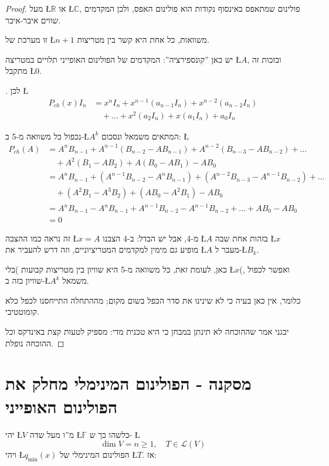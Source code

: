 \documentclass[english,hebrew]{article}
\begin{document}
\begin{proof}
מעל \L{$\mathbb{R}$} או \L{$\mathbb{C}$}, פולינום שמתאפס באינסוף
נקודות הוא פולינום האפס, ולכן המקדמים שווים איבר-איבר.

זו מערכת של \L{$n+1$} משוואות, כל אחת היא קשר בין מטריצות. 

יש כאן \textquotedblright קונספירציה\textquotedblright : המקדמים של
הפולינום האופייני תלויים במטריצה \L{$A$}, ובזכות זה מתקבל \L{$0$}.

{\endL}. לכן \L{%
\begin{align*}
P_{ch}(x)I_{n} & =x^{n}I_{n}+x^{n-1}(a_{n-1}I_{n})+x^{n-2}(a_{n-2}I_{n})\\
 & \quad+\dots+x^{2}(a_{2}I_{n})+x(a_{1}I_{n})+a_{0}I_{n}
\end{align*}
}%

נכפול כל משוואה מ-5 ב-\L{$A^{k}$} המתאים משמאל ונסכום: \L{%
\begin{align*}
P_{ch}(A) & =A^{n}B_{n-1}+A^{n-1}(B_{n-2}-AB_{n-1})+A^{n-2}(B_{n-3}-AB_{n-2})+\dots\\
 & \quad+A^{2}(B_{1}-AB_{2})+A(B_{0}-AB_{1})-AB_{0}\\
 & =A^{n}B_{n-1}+\left(A^{n-1}B_{n-2}-A^{n}B_{n-1}\right)+\left(A^{n-2}B_{n-3}-A^{n-1}B_{n-2}\right)+\dots\\
 & \quad+\left(A^{2}B_{1}-A^{3}B_{2}\right)+\left(AB_{0}-A^{2}B_{1}\right)-AB_{0}\\
 & =A^{n}B_{n-1}-A^{n}B_{n-1}+A^{n-1}B_{n-2}-A^{n-1}B_{n-2}+\dots+AB_{0}-AB_{0}\\
 & =0
\end{align*}
}%

זה נראה כמו ההצבה \L{$x=A$} מ-4, אבל יש הבדל: ב-4 הצבנו \L{$A$}
בזהות אחת שבה \L{$x$} מופיע גם מימין למקדמים המטריציוניים, וזה דרש
להעביר את \L{$A$} מעבר ל-\L{$B_{k}$}. 

כאן, לעומת זאת, כל משוואה מ-5 היא שוויון בין מטריצות קבועות )בלי \L{$x$}(,
ואפשר לכפול שוויון כזה ב-\L{$A^{k}$} משמאל.

כלומר, אין כאן בעיה כי לא שינינו את סדר הכפל בשום מקום; מההתחלה התייחסנו
לכפל כלא קומוטטיבי.

יבגני אמר שההוכחה לא תינתן במבחן כי היא טכנית מדי: מספיק לטעות קצת
באינדקס וכל ההוכחה נופלת.
\end{proof}

\section{מסקנה - הפולינום המינימלי מחלק את הפולינום האופייני}

יהי \L{$V$} מ\textquotedblright ו מעל שדה \L{$\mathbb{F}$} כלשהו
כך ש- \L{%
\[
\dim V=n\geq1,\quad T\in\mathcal{L}(V)
\]
}%
ויהי \L{$q_{\min}(x)$} הפולינום המינימלי של \L{$T$}. אז:
\end{document}
